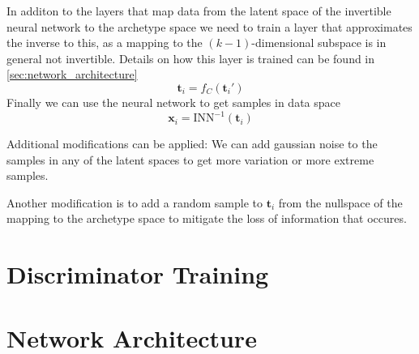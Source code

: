 In additon to the layers that map data from the latent space of the invertible
neural network to the archetype space we need to train a layer that
approximates the inverse to this, as a mapping to the $(k-1)$-dimensional
subspace is in general not invertible. Details on how this layer is trained can
be found in \autoref{sec:network_architecture}
\begin{equation}%
    \label{eq:aa_upsample}
    \mathbf{t}_i = f_C (\mathbf{t}_i')
\end{equation}
Finally we can use the neural network to get samples in data space
\begin{equation}%
    \label{eq:aa_to_data}
    \mathbf{x}_i = \mathrm{INN}^{-1} (\mathbf{t}_i)
\end{equation}

Additional modifications can be applied: We can add gaussian noise to the
samples in any of the latent spaces to get more variation or more extreme
samples.

Another modification is to add a random sample to $\mathbf{t}_i$ from the
nullspace of the mapping to the archetype space to mitigate the loss of
information that occures.

\section{Discriminator Training}%
\label{sec:discriminator_training}


\section{Network Architecture}%
\label{sec:network_architecture}

\begin{figure}[htpb]
\begin{center}
\end{center}
\caption{}%
\label{fig:inn_aa_forward}
\end{figure}


